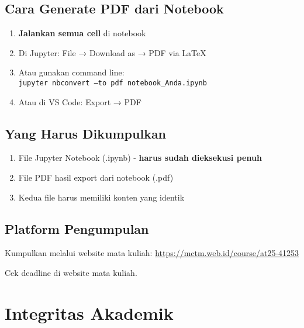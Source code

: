 \documentclass[12pt,a4paper]{article}
\begin{document}
\subsection{Cara Generate PDF dari Notebook}
\begin{enumerate}
    \item \textbf{Jalankan semua cell} di notebook
    \item Di Jupyter: File → Download as → PDF via LaTeX
    \item Atau gunakan command line: \\
    \texttt{jupyter nbconvert --to pdf notebook\_Anda.ipynb}
    \item Atau di VS Code: Export → PDF
\end{enumerate}

\subsection{Yang Harus Dikumpulkan}
\begin{enumerate}
    \item File Jupyter Notebook (.ipynb) - \textbf{harus sudah dieksekusi penuh}
    \item File PDF hasil export dari notebook (.pdf)
    \item Kedua file harus memiliki konten yang identik
\end{enumerate}

\subsection{Platform Pengumpulan}
Kumpulkan melalui website mata kuliah: \url{https://mctm.web.id/course/at25-41253}

Cek deadline di website mata kuliah.

\section{Integritas Akademik}
\end{document}
